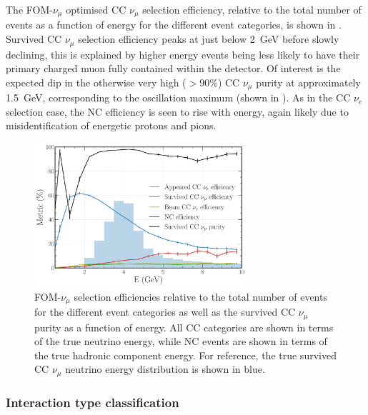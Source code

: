 The FOM-$\nu_{\mu}$ optimised CC $\nu_{\mu}$ selection efficiency, relative to the total number of
events as a function of energy for the different event categories, is shown in
. Survived CC $\nu_{\mu}$ selection efficiency peaks at just below
\SI{2}{\GeV} before slowly declining, this is explained by higher energy events being less likely
to have their primary charged muon fully contained within the detector. Of interest is the
expected dip in the otherwise very high ($>90\%$) CC $\nu_{\mu}$ purity at approximately
\SI{1.5}{\GeV}, corresponding to the oscillation maximum (shown in ).
As in the CC $\nu_{e}$ selection case, the NC efficiency is seen to rise with energy, again likely
due to misidentification of energetic protons and pions.

\begin{figure} %
    \includegraphics[width=0.7\textwidth]{diagrams/7-results/final_numu_hists.pdf}
    \caption[Efficiency of the CC $\nu_{\mu}$ selection as a function of energy]
    {FOM-$\nu_{\mu}$ selection efficiencies relative to the total number of events for the
        different event categories as well as the survived CC $\nu_{\mu}$ purity as a function of
        energy. All CC categories are shown in terms of the true neutrino energy, while NC events
        are shown in terms of the true hadronic component energy. For reference, the true survived
        CC $\nu_{\mu}$ neutrino energy distribution is shown in blue.}
    \label{fig:final_numu_hists}
\end{figure}

\subsubsection*{Interaction type classification} %

